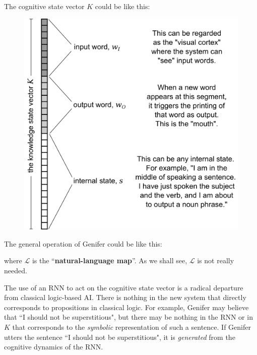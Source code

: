 \documentclass[12pt]{article}
\begin{document}
The cognitive state vector $K$ could be like this:
\begin{figure}[H]
\centering
\includegraphics[scale=0.75]{internal-state-K.png}
\end{figure}

The general operation of Genifer could be like this:
\begin{center}
\end{center}
where $\mathcal{L}$ is the ``\textbf{natural-language map}''.  As we shall see, $\mathcal{L}$ is not really needed.

The use of an RNN to act on the cognitive state vector is a radical departure from classical logic-based AI.  There is nothing in the new system that directly corresponds to propositions in classical logic.  For example, Genifer may believe that ``I should not be superstitious", but there may be nothing in the RNN or in $K$ that corresponds to the \textit{symbolic} representation of such a sentence.  If Genifer utters the sentence ``I should not be superstitious", it is \textit{generated} from the cognitive dynamics of the RNN.
\end{document}
